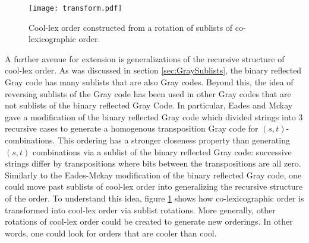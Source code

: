 \begin{figure}
\begin{center}
        \texttt{[image: transform.pdf]}
\end{center}
\caption{Cool-lex order constructed from a rotation of sublists of co-lexicographic order.}
\label{fig:cooltransform}
\end{figure}

A further avenue for extension is generalizations of the recursive structure of cool-lex order.  As was discussed in section \ref{sec:GraySublists}, the binary reflected Gray code has many sublists that are also Gray codes.  Beyond this, the idea of reversing sublists of the Gray code has been used in other Gray codes that are not sublists of the binary reflected Gray Code.  In particular, Eades and Mckay gave a modification of the binary reflected Gray code which divided strings into 3 recursive cases to generate a homogenous transposition Gray code for $(s,t)$-combinations. This ordering has a stronger closeness property than generating $(s,t)$ combinations via a sublist of the binary reflected Gray code: successive strings differ by transpositions where bits between the transpositions are all zero.  Similarly to the Eades-Mckay modification of the binary reflected Gray code, one could move past sublists of cool-lex order into generalizing the recursive structure of the order.  To understand this idea, figure \ref{fig:cooltransform} shows how co-lexicographic order is transformed into cool-lex order via sublist rotations.  More generally, other rotations of cool-lex order could be created to generate new orderings. In other words, one could look for orders that are cooler than cool. 

